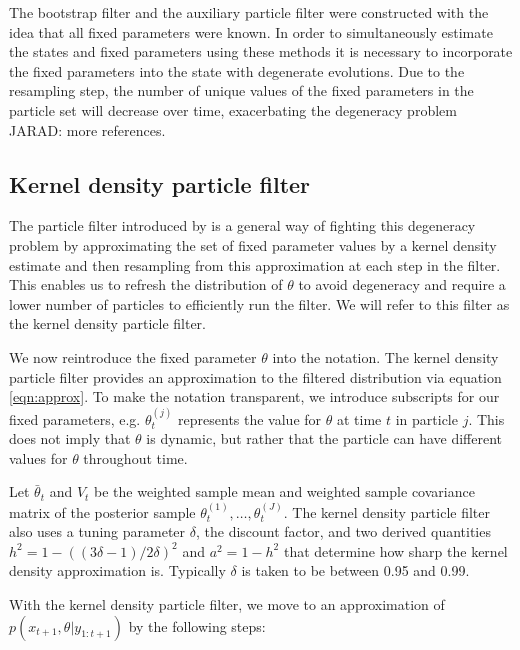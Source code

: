 \documentclass{elsarticle}
\newcommand{\jarad}[1]{{\color{red}JARAD: #1}}
\begin{document}
The bootstrap filter and the auxiliary particle filter were constructed with the idea that all fixed parameters were known. In order to simultaneously estimate the states and fixed parameters using these methods it is necessary to incorporate the fixed parameters into the state with degenerate evolutions. Due to the resampling step, the number of unique values of the fixed parameters in the particle set will decrease over time, exacerbating the degeneracy problem \citep{Liu:West:comb:2001} \jarad{more references}.

\subsection{Kernel density particle filter} \label{sec:kd}

The particle filter introduced by \cite{Liu:West:comb:2001} is a general way of fighting this degeneracy problem by approximating the set of fixed parameter values by a kernel density estimate and then resampling from this approximation at each step in the filter. This enables us to refresh the distribution of $\theta$ to avoid degeneracy and require a lower number of particles to efficiently run the filter. We will refer to this filter as the kernel density particle filter.

We now reintroduce the fixed parameter $\theta$ into the notation. The kernel density particle filter provides an approximation to the filtered distribution via equation \eqref{eqn:approx}. To make the notation transparent, we introduce subscripts for our fixed parameters, e.g. $\theta_t^{(j)}$ represents the value for $\theta$ at time $t$ in particle $j$. This does not imply that $\theta$ is dynamic, but rather that the particle can have different values for $\theta$ throughout time.

Let $\bar{\theta}_t$ and $V_t$ be the weighted sample mean and weighted sample covariance matrix of the posterior sample $\theta_t^{(1)},\ldots,\theta_t^{(J)}$.  The kernel density particle filter also uses a tuning parameter $\delta$, the discount factor, and two derived quantities $h^2 = 1 - ((3\delta - 1)/2\delta)^2$ and $a^2 = 1 - h^2$ that determine how sharp the kernel density approximation is. Typically $\delta$ is taken to be between 0.95 and 0.99.

With the kernel density particle filter, we move to an approximation of $p(x_{t+1},\theta|y_{1:t+1})$ by the following steps:
\end{document}
